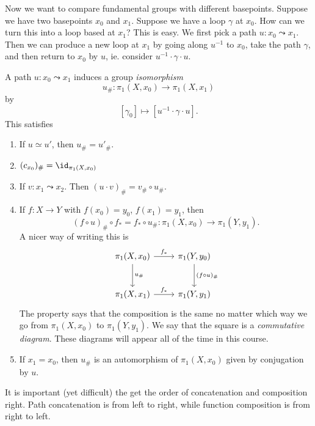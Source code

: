 \documentclass[a4paper]{article}
\begin{document}
Now we want to compare fundamental groups with different basepoints. Suppose we have two basepoints $x_0$ and $x_1$. Suppose we have a loop $\gamma$ at $x_0$. How can we turn this into a loop based at $x_1$? This is easy. We first pick a path $u: x_0 \leadsto x_1$. Then we can produce a new loop at $x_1$ by going along $u^{-1}$ to $x_0$, take the path $\gamma$, and then return to $x_0$ by $u$, ie. consider $u^{-1}\cdot \gamma\cdot u$.
\begin{center}
\end{center}

\begin{prop}
  A path $u: x_0 \leadsto x_1$ induces a group \emph{isomorphism}
  \[
    u_\#: \pi_1(X, x_0) \to \pi_1(X, x_1)
  \]
  by
  \[
    [\gamma_0] \mapsto [u^{-1}\cdot \gamma \cdot u].
  \]
  This satisfies
  \begin{enumerate}
    \item If $u\simeq u'$, then $u_\# = u'_\#$.
    \item $(c_{x_0})_\# = \id_{\pi_1(X, x_0)}$
    \item If $v: x_1 \leadsto x_2$. Then $(u\cdot v)_\# = v_\# \circ u_\#$.
    \item If $f: X\to Y$ with $f(x_0) = y_0$, $f(x_1) = y_1$, then
      \[
        (f\circ u)_\# \circ f_* = f_* \circ u_\#: \pi_1(X, x_0) \to \pi_1(Y, y_1).
      \]
      A nicer way of writing this is
      \[
        \begin{tikzcd}[row sep=large]
          \pi_1(X, x_0) \ar[r, "f_*"] \ar[d, "u_\#"] & \pi_1(Y, y_0)\ar [d, "(f\circ u)_\#"]\\
          \pi_1(X, x_1) \ar[r, "f_*"] & \pi_1(Y, y_1)
        \end{tikzcd}
      \]
      The property says that the composition is the same no matter which way we go from $\pi_1(X, x_0)$ to $\pi_1(Y, y_1)$. We say that the square is a \emph{commutative diagram}. These diagrams will appear all of the time in this course.
    \item If $x_1 = x_0$, then $u_\#$ is an automorphism of $\pi_1(X, x_0)$ given by conjugation by $u$.
  \end{enumerate}
\end{prop}
It is important (yet difficult) the get the order of concatenation and composition right. Path concatenation is from left to right, while function composition is from right to left.
\end{document}
